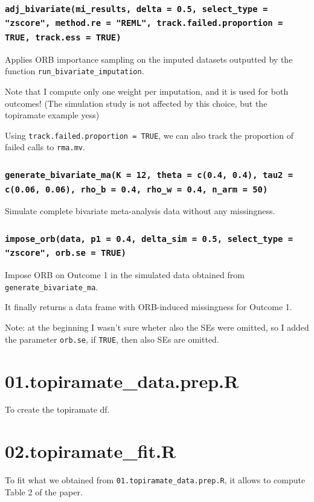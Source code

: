 \documentclass{article}\usepackage[]{graphicx}\usepackage[]{xcolor}
\begin{document}
\subsubsection{\texttt{adj\_bivariate(mi\_results, delta = 0.5, select\_type = "zscore", method.re = "REML", track.failed.proportion = TRUE, track.ess = TRUE)}}
Applies ORB importance sampling on the imputed datasets outputted by the function \texttt{run\_bivariate\_imputation}. 

Note that I compute only one weight per imputation, and it is used for both outcomes! (The simulation study is not affected by this choice, but the topiramate example yess)

Using \texttt{track.failed.proportion = TRUE}, we can also track the proportion of failed calls to \texttt{rma.mv}.

\subsubsection{\texttt{generate\_bivariate\_ma(K = 12, theta = c(0.4, 0.4), tau2 = c(0.06, 0.06), rho\_b = 0.4, rho\_w = 0.4, n\_arm = 50)}}
Simulate complete bivariate meta-analysis data without any missingness.





\subsubsection{\texttt{impose\_orb(data, p1 = 0.4, delta\_sim = 0.5, select\_type = "zscore", orb.se = TRUE)}}
Impose ORB on Outcome 1 in the simulated data obtained from \texttt{generate\_bivariate\_ma}.

It finally returns a data frame with ORB-induced missingness for Outcome 1.

Note: at the beginning I wasn't sure wheter also the SEs were omitted,  so I added the parameter \texttt{orb.se}, if \texttt{TRUE}, then also SEs are omitted. 



\section*{01.topiramate\_data.prep.R}
To create the topiramate df.

\section*{02.topiramate\_fit.R}
To fit what we obtained from \texttt{01.topiramate\_data.prep.R}, it allows to compute Table 2 of the paper. 
\end{document}
